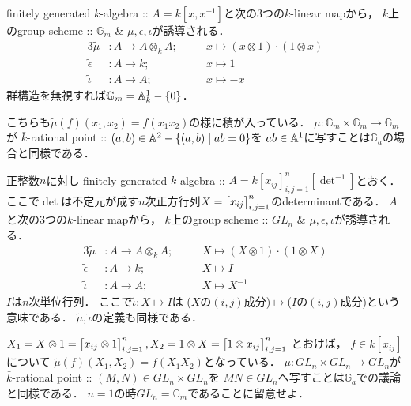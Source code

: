 \documentclass[a4paper]{jsarticle}
\newcommand{\Ga}{\mathbb{G}_a}
\newcommand{\Gm}{\mathbb{G}_m}
\newcommand{\GL}{GL}
\begin{document}
    \begin{Example}
        finitely generated $k$-algebra :: $A=k[x,x^{-1}]$と次の3つの$k$-linear mapから，
        $k$上のgroup scheme :: $\Gm$ \& $\mu,\epsilon,\iota$が誘導される．
        \begin{alignat*}{3}
            \tilde{\mu}&:
                A \to A \otimes_k A; &&
                \quad x \mapsto (x \otimes 1) \cdot (1 \otimes x) \\
            \tilde{\epsilon}&:
                A \to k; &&
                \quad x \mapsto 1 \\
            \tilde{\iota}&:
                A \to A; &&
                \quad x \mapsto -x
        \end{alignat*}
        群構造を無視すれば$\Gm=\affine^1_k-\{0\}$．

        こちらも$\tilde{\mu}(f)(x_1,x_2)=f(x_1x_2)$の様に積が入っている．
        $\mu: \Gm \times \Gm \to \Gm$が
        $\bar{k}$-rational point :: $(a,b) \in \mathbb{A}^2-\{(a,b) \mid ab=0\}$を
        $ab \in \mathbb{A}^1$に写すことは$\Ga$の場合と同様である．
    \end{Example}
    \begin{Example}
        正整数$n$に対し
        finitely generated $k$-algebra :: $A=k[x_{ij}]_{i,j=1}^n [\det^{-1}]$とおく．
        ここで$\det$は不定元が成す$n$次正方行列$X=\begin{bmatrix}x_{ij}\end{bmatrix}_{i,j=1}^n$のdeterminantである．
        $A$と次の3つの$k$-linear mapから，
        $k$上のgroup scheme :: $\GL_n$ \& $\mu,\epsilon,\iota$が誘導される．
        \begin{alignat*}{3}
            \tilde{\mu}&:
                A \to A \otimes_k A; &&
                \quad X \mapsto (X \otimes 1) \cdot (1 \otimes X) \\
            \tilde{\epsilon}&:
                A \to k; &&
                \quad X \mapsto I \\
            \tilde{\iota}&:
                A \to A; &&
                \quad X \mapsto X^{-1}
        \end{alignat*}
        $I$は$n$次単位行列．
        ここで$\tilde{\iota}: X \mapsto I$は
        ($X$の$(i,j)$成分)$\mapsto$($I$の$(i,j)$成分)という意味である．
        $\tilde{\mu}, \tilde{\iota}$の定義も同様である．

        $X_1=X \otimes 1=\begin{bmatrix}x_{ij} \otimes 1\end{bmatrix}_{i,j=1}^n,
        X_2=1 \otimes X=\begin{bmatrix}1 \otimes x_{ij}\end{bmatrix}_{i,j=1}^n$
        とおけば，
        $f \in k[x_{ij}]$について
        $\tilde{\mu}(f)(X_1, X_2)=f(X_1X_2)$となっている．
        $\mu: \GL_n \times \GL_n \to \GL_n$が
        $\bar{k}$-rational point :: $(M,N) \in \GL_n \times \GL_n$を
        $MN \in \GL_n$へ写すことは$\Ga$での議論と同様である．
        $n=1$の時$\GL_n=\Gm$であることに留意せよ．
    \end{Example}
\end{document}

